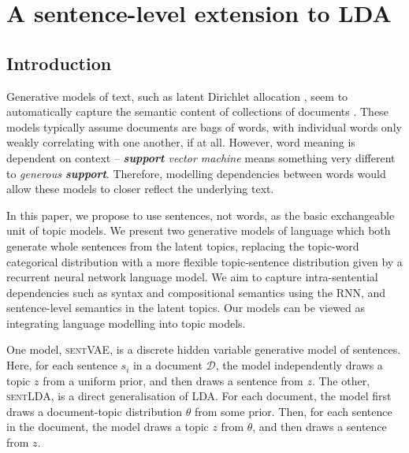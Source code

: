 \chapter{A sentence-level extension to LDA}
\label{chap:sentencelda}

\section{Introduction}

Generative models of text, such as latent Dirichlet allocation \citep{Blei:03}, seem to automatically capture the semantic content of collections of documents \citep{Griffiths:04}. These models typically assume documents are bags of words, with individual words only weakly correlating with one another, if at all. However, word meaning is dependent on context -- \textit{\textbf{support} vector machine} means something very different to \textit{generous \textbf{support}}. Therefore, modelling dependencies between words would allow these models to closer reflect the underlying text.

In this paper, we propose to use sentences, not words, as the basic exchangeable unit of topic models. We present two generative models of language which both generate whole sentences from the latent topics, replacing the topic-word categorical distribution with a more flexible topic-sentence distribution given by a recurrent neural network language model. We aim to capture intra-sentential dependencies such as syntax and compositional semantics using the RNN, and sentence-level semantics in the latent topics. Our models can be viewed as integrating language modelling into topic models.

One model, \textsc{sentVAE}, is a discrete hidden variable generative model of sentences. Here, for each sentence $s_i$ in a document $\mathcal{D}$, the model independently draws a topic $z$ from a uniform prior, and then draws a sentence from $z$. The other, \textsc{sentLDA}, is a direct generalisation of LDA. For each document, the model first draws a document-topic distribution $\theta$ from some prior. Then, for each sentence in the document, the model draws a topic $z$ from $\theta$, and then draws a sentence from $z$.

